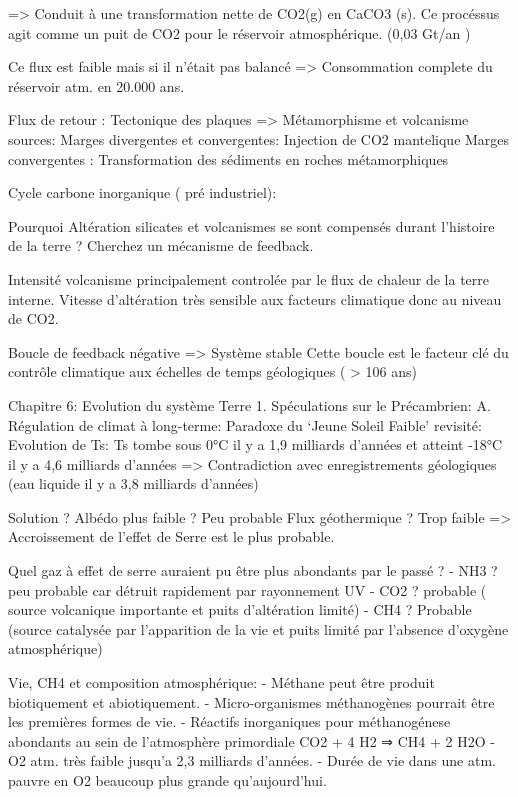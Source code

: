         => Conduit à une transformation nette de CO2(g) en CaCO3 (s). Ce procéssus agit 
comme un puit de CO2 pour le réservoir atmosphérique. (0,03 Gt/an )


Ce flux est faible mais si il n’était pas balancé => Consommation complete du réservoir atm. en 20.000 ans.


  



Flux de retour : Tectonique des plaques => Métamorphisme et volcanisme
sources:
Marges divergentes et convergentes: Injection de CO2 mantelique
Marges convergentes : Transformation des sédiments en roches métamorphiques


Cycle carbone inorganique ( pré industriel):
  





Pourquoi Altération silicates et volcanismes se sont compensés durant l’histoire de la terre ?
Cherchez un mécanisme de feedback.


Intensité volcanisme principalement controlée par le flux de chaleur de la terre interne.
Vitesse d’altération très sensible aux facteurs climatique donc au niveau de CO2.
  

Boucle de feedback négative => Système stable
Cette boucle est le facteur clé du contrôle climatique aux échelles de temps géologiques ( > 106 ans)


Chapitre 6: Evolution du système Terre
1. Spéculations sur le Précambrien:
A. Régulation de climat à long-terme: Paradoxe du ‘Jeune Soleil Faible’ revisité:
Evolution de Ts:
Ts tombe sous 0°C il y a 1,9 milliards d’années et atteint -18°C il y a 4,6 milliards d’années
=> Contradiction avec enregistrements géologiques (eau liquide il y a 3,8 milliards d’années)


Solution ?
Albédo plus faible ? Peu probable
Flux géothermique ? Trop faible
=> Accroissement de l’effet de Serre est le plus probable.


Quel gaz à effet de serre auraient pu être plus abondants par le passé ?
- NH3 ? peu probable car détruit rapidement par rayonnement UV
- CO2 ? probable ( source volcanique importante et puits d’altération limité)
- CH4 ? Probable (source catalysée par l’apparition de la vie et puits limité par l’absence d’oxygène atmosphérique)


Vie, CH4 et composition atmosphérique:
- Méthane peut être produit biotiquement et abiotiquement.
- Micro-organismes méthanogènes pourrait être les premières formes de vie.
- Réactifs inorganiques pour méthanogénese abondants au sein de l’atmosphère primordiale
        CO2 + 4 H2 ⇒ CH4 + 2 H2O
- O2 atm. très faible jusqu’a 2,3 milliards d’années.
- Durée de vie dans une atm. pauvre en O2 beaucoup plus grande qu’aujourd’hui.


